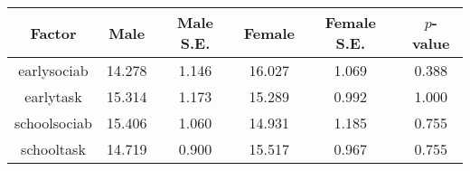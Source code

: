 \begin{longtable}{c c c c c c}
\toprule
\textbf{Factor} & \textbf{Male} & \textbf{Male S.E.}  & \textbf{Female} & \textbf{Female S.E.} & \textbf{$ p $-value} \\
\midrule
earlysociab & 14.278 & 1.146 &  16.027 & 1.069 & 0.388 \\
earlytask & 15.314 & 1.173 &  15.289 & 0.992 & 1.000 \\
schoolsociab & 15.406 & 1.060 &  14.931 & 1.185 & 0.755 \\
schooltask & 14.719 & 0.900 &  15.517 & 0.967 & 0.755 \\
\bottomrule
\end{longtable}

